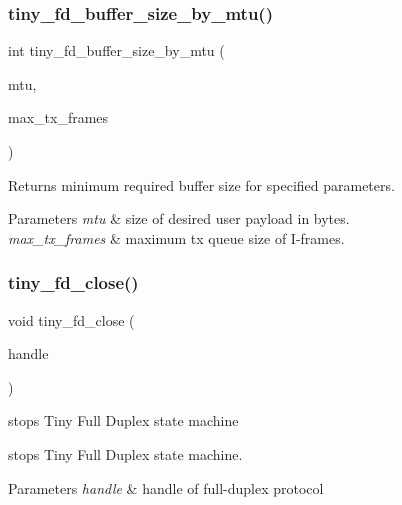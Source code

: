 \subsubsection{\texorpdfstring{tiny\+\_\+fd\+\_\+buffer\+\_\+size\+\_\+by\+\_\+mtu()}{tiny\_fd\_buffer\_size\_by\_mtu()}}
{\footnotesize\ttfamily int tiny\+\_\+fd\+\_\+buffer\+\_\+size\+\_\+by\+\_\+mtu (\begin{DoxyParamCaption}\item[{int}]{mtu,  }\item[{int}]{max\+\_\+tx\+\_\+frames }\end{DoxyParamCaption})}

Returns minimum required buffer size for specified parameters. 
\begin{DoxyParams}{Parameters}
{\em mtu} & size of desired user payload in bytes. \\
\hline
{\em max\+\_\+tx\+\_\+frames} & maximum tx queue size of I-\/frames. \\
\hline
\end{DoxyParams}
\mbox{\label{group__FULL__DUPLEX__API_ga11e470503e3359bc29a5bcb65a9771d5}} 
\subsubsection{\texorpdfstring{tiny\+\_\+fd\+\_\+close()}{tiny\_fd\_close()}}
{\footnotesize\ttfamily void tiny\+\_\+fd\+\_\+close (\begin{DoxyParamCaption}\item[{\hyperlink{group__FULL__DUPLEX__API_ga91e6b79431fe38570fb102701ef0b7e8}{tiny\+\_\+fd\+\_\+handle\+\_\+t}}]{handle }\end{DoxyParamCaption})}



stops Tiny Full Duplex state machine 

stops Tiny Full Duplex state machine.


\begin{DoxyParams}{Parameters}
{\em handle} & handle of full-\/duplex protocol \\
\hline
\end{DoxyParams}
\mbox{\label{group__FULL__DUPLEX__API_ga27fa59dffd1575419753beb35282bad5}} 
